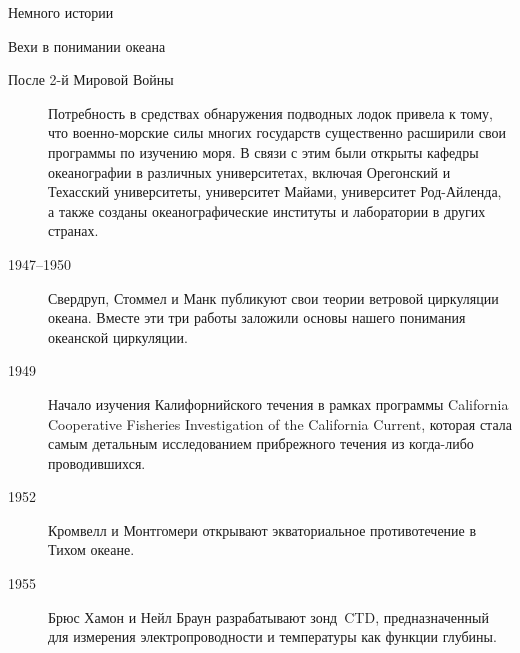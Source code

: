 \begin{chapter}{Немного истории}
\begin{section}{Вехи в понимании океана}
\begin{description}
\item[После 2-й Мировой Войны] Потребность в средствах обнаружения 
подводных лодок привела к тому, что военно-морские силы многих государств 
существенно расширили свои программы по изучению моря. В связи с этим
были открыты кафедры океанографии в различных
университетах, включая Орегонский и Техасский университеты,
университет Майами, университет Род-Айленда, а также созданы 
океанографические институты и лаборатории в других странах.
%

\item[1947--1950] Свердруп, Стоммел и Манк публикуют свои теории
ветровой циркуляции океана. Вместе эти три работы заложили основы
нашего понимания океанской циркуляции.
%

\item[1949] Начало изучения Калифорнийского течения в рамках программы
California Cooperative Fisheries Investigation of the California
Current, которая стала самым детальным исследованием прибрежного течения
из когда-либо проводившихся.
%


\item[1952] Кромвелл и Монтгомери открывают экваториальное
противотечение в Тихом океане.
%


\item[1955] Брюс Хамон и Нейл Браун разрабатывают зонд~CTD, предназначенный
для измерения электропроводности и температуры как функции глубины.
%


\end{description}
\end{section}
\end{chapter}
